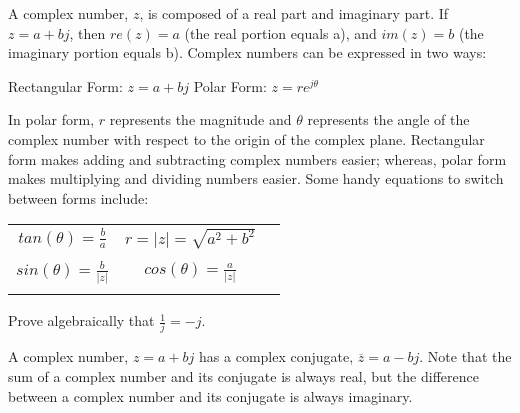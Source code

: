 
A complex number, $z$, is composed of a real part and imaginary part.
If $z = a + bj$, then $re(z) = a$ (the real portion equals a), and $im(z) = b$ (the imaginary portion equals b).
Complex numbers can be expressed in two ways:

\begin{center}
Rectangular Form: $z = a + bj$ \hspace{1em} Polar Form: $z = re^{j\theta}$
\end{center}

In polar form, $r$ represents the magnitude and $\theta$ represents the angle of the complex number with respect to the origin of the complex plane.
Rectangular form makes adding and subtracting complex numbers easier; whereas, polar form makes multiplying and dividing numbers easier.
Some handy equations to switch between forms include:

\begin{center}
\begin{tabular}{ c c c }
 $tan(\theta) = \frac{b}{a}$ & $r = |z| = \sqrt{a^2 + b^2}$ \\ \\
 $sin(\theta) = \frac{b}{|z|}$ & $cos(\theta) = \frac{a}{|z|}$ \\  \\
\end{tabular}
\end{center}

\begin{enumerate}

\qitem Prove algebraically that $\frac{1}{j} = -j$.


\end{enumerate}

A complex number, $z = a + bj$ has a complex conjugate, $\overline{z} = a - bj$.
Note that the sum of a complex number and its conjugate is always real, but the difference between a complex number and its conjugate is always imaginary.

